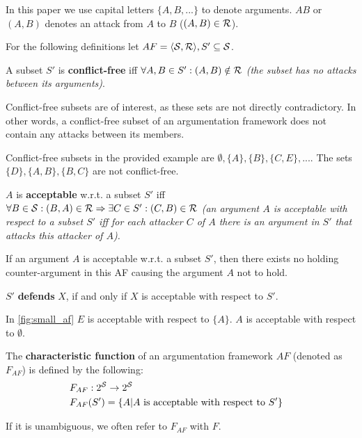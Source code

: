 \begin{notation}
In this paper we use capital letters $\{A, B, ...\}$ to denote arguments. $AB$ or $(A, B)$ denotes an attack from $A$ to $B$ ($(A,B) \in \R$).	
\end{notation}

For the following definitions let $AF=\langle \S, \R \rangle, S' \subseteq \S$.

\begin{definition}
	A subset $S'$ is \textbf{conflict-free} iff $ \forall A, B \in S': (A, B) \notin \R$ \textit{(the subset has no attacks between its arguments)}.
\end{definition}
\begin{remark}
	Conflict-free subsets are of interest, as these sets are not directly contradictory. In other words, a conflict-free subset of an argumentation framework does not contain any attacks between its members.
\end{remark}
\begin{exa}
Conflict-free subsets in the provided example are $\emptyset, \{A\}, \{B\}, \{C, E\}, ...$. The sets $\{D\}, \{A, B\}, \{B, C\}$ are not conflict-free.
\end{exa}

\begin{definition}
$A$ is \textbf{acceptable} w.r.t. a subset $S'$ iff  $\forall B \in \S: (B, A) \in \R \Rightarrow \exists C \in S': (C, B) \in \R$ \textit{(an argument $A$ is acceptable with respect to a subset $S'$ iff for each attacker $C$ of $A$ there is an argument in $S'$ that attacks this attacker of $A$). }
\end{definition}

\begin{remark}
If an argument $A$ is acceptable w.r.t. a subset $S'$, then there exists no holding counter-argument in this \gls{AF} causing the argument $A$ not to hold.
\end{remark}

\begin{lemma}
	$S'$ \textbf{defends} $X$, if and only if $X$ is acceptable with respect to $S'$.
\end{lemma}

\begin{exa}
In  \autoref{fig:small_af} $E$ is acceptable with respect to $\{A\}$. $A$ is acceptable with respect to $\emptyset$. 
\end{exa}


\begin{definition}
The \textbf{characteristic function} of an argumentation framework $AF$ (denoted as $F_{AF}$) is defined by the following:
	\begin{align*}
		&F_{AF}: 2^{\S} \rightarrow 2^\S &\\
		&F_{AF}(S') = \{A | A~\text{is acceptable with respect to}~S'\} &
	\end{align*}
\end{definition}
\begin{notation}
	If it is unambiguous, we often refer to $F_{AF}$ with $F$. 
\end{notation}


